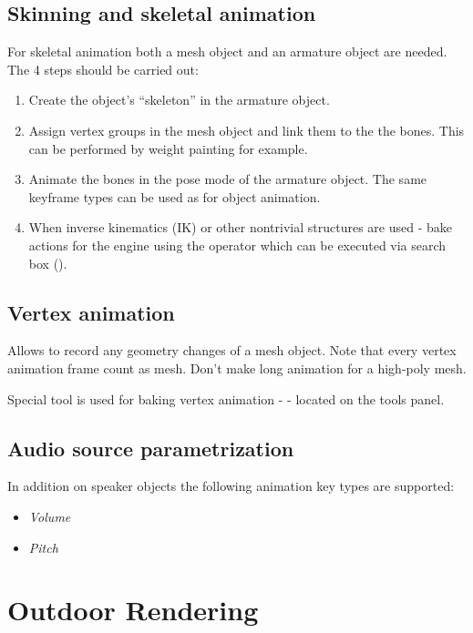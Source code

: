 \documentclass[a4paper,12pt,oneside]{sphinxmanual}
\begin{document}
\section{Skinning and skeletal animation}
\label{animation:id4}
For skeletal animation both a mesh object and an armature object are needed. The 4 steps should be carried out:
\begin{enumerate}
\item {} 
Create the object's ``skeleton'' in the armature object.

\item {} 
Assign vertex groups in the mesh object and link them to the the bones. This can be performed by weight painting for example.

\item {} 
Animate the bones in the pose mode of the armature object. The same keyframe types can be used as for object animation.

\item {} 
When inverse kinematics (IK) or other nontrivial structures are used - bake actions for the engine using the  operator which can be executed via search box ().

\end{enumerate}


\section{Vertex animation}
\label{animation:id5}
Allows to record any geometry changes of a mesh object. Note that every vertex animation frame count as mesh. Don't make long animation for a high-poly mesh.

Special tool is used for baking vertex animation -  - located on the  tools panel.


\section{Audio source parametrization}
\label{animation:id6}
In addition on speaker objects the following animation key types are supported:
\begin{itemize}
\item {} 
\emph{Volume}

\item {} 
\emph{Pitch}

\end{itemize}


\chapter{Outdoor Rendering}
\label{outdoor_rendering:outdoor-rendering}\label{outdoor_rendering::doc}\label{outdoor_rendering:id1}
\end{document}

